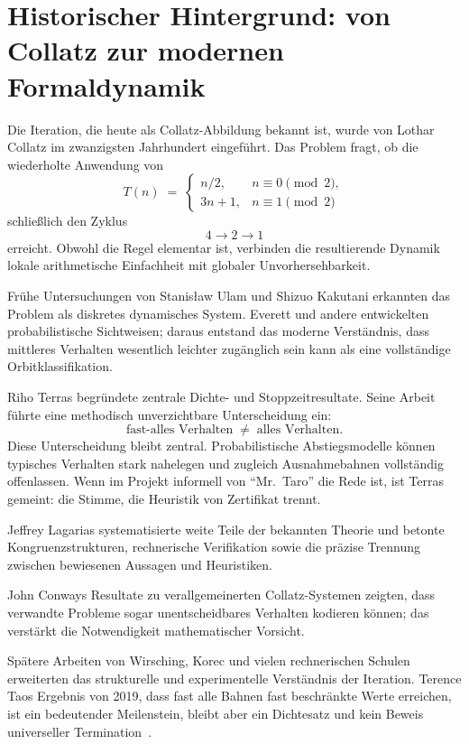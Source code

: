 \documentclass[11pt,a4paper]{article}
\theoremstyle{definition}
\theoremstyle{remark}
\begin{document}
\section{Historischer Hintergrund: von Collatz zur modernen Formaldynamik}

Die Iteration, die heute als Collatz-Abbildung bekannt ist, wurde von
Lothar Collatz im zwanzigsten Jahrhundert eingeführt. Das Problem fragt,
ob die wiederholte Anwendung von
\[
  T(n)
  \;=\;
  \begin{cases}
    n/2, & n\equiv 0\pmod{2},\\
    3n+1, & n\equiv 1\pmod{2}
  \end{cases}
\]
schließlich den Zyklus
\[
  4\to 2\to 1
\]
erreicht. Obwohl die Regel elementar ist, verbinden die resultierende
Dynamik lokale arithmetische Einfachheit mit globaler Unvorhersehbarkeit.

Frühe Untersuchungen von Stanisław Ulam und Shizuo Kakutani erkannten das
Problem als diskretes dynamisches System. Everett und andere entwickelten
probabilistische Sichtweisen; daraus entstand das moderne Verständnis, dass
mittleres Verhalten wesentlich leichter zugänglich sein kann als eine
vollständige Orbitklassifikation.

Riho Terras begründete zentrale Dichte- und Stoppzeitresultate. Seine Arbeit
führte eine methodisch unverzichtbare Unterscheidung ein:
\[
  \text{fast-alles Verhalten}
  \;\neq\;
  \text{alles Verhalten}.
\]
Diese Unterscheidung bleibt zentral. Probabilistische Abstiegsmodelle können
typisches Verhalten stark nahelegen und zugleich Ausnahmebahnen vollständig
offenlassen. Wenn im Projekt informell von ``Mr.~Taro'' die Rede ist, ist
Terras gemeint: die Stimme, die Heuristik von Zertifikat trennt.

Jeffrey Lagarias systematisierte weite Teile der bekannten Theorie und
betonte Kongruenzstrukturen, rechnerische Verifikation sowie die präzise
Trennung zwischen bewiesenen Aussagen und Heuristiken.

John Conways Resultate zu verallgemeinerten Collatz-Systemen zeigten, dass
verwandte Probleme sogar unentscheidbares Verhalten kodieren können; das
verstärkt die Notwendigkeit mathematischer Vorsicht.

Spätere Arbeiten von Wirsching, Korec und vielen rechnerischen Schulen
erweiterten das strukturelle und experimentelle Verständnis der Iteration.
Terence Taos Ergebnis von 2019, dass fast alle Bahnen fast beschränkte Werte
erreichen, ist ein bedeutender Meilenstein, bleibt aber ein Dichtesatz und
kein Beweis universeller Termination~\cite{Tao2019}.
\end{document}
